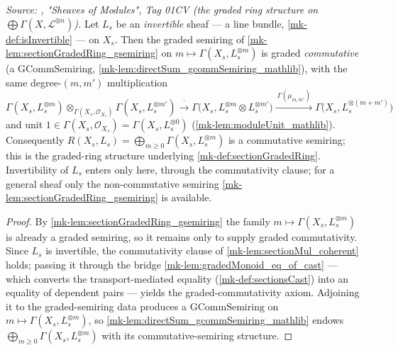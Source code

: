 \begin{lemma}\label{mk-lem:sectionGradedRing_gcommSemiring}
  \leanok

  \textit{Source: \cite{stacks-project}, "Sheaves of Modules", Tag 01CV (the graded
  ring structure on \(\bigoplus \Gamma(X,\mathcal{L}^{\otimes n})\)).}
  Let \(L_s\) be an \emph{invertible} sheaf --- a line bundle,
  \ref{mk-def:isInvertible} --- on \(X_s\). Then the graded semiring of
  \ref{mk-lem:sectionGradedRing_gsemiring} on
  \(m \mapsto \Gamma(X_s, L_s^{\otimes m})\) is graded \emph{commutative} (a
  \(\mathrm{GCommSemiring}\), \ref{mk-lem:directSum_gcommSemiring_mathlib}), with the
  same degree-\((m,m')\) multiplication
  \[
    \Gamma(X_s, L_s^{\otimes m}) \otimes_{\Gamma(X_s,\mathcal{O}_{X_s})}
      \Gamma(X_s, L_s^{\otimes m'})
    \xrightarrow{\ \cdot\ }
    \Gamma\bigl(X_s, L_s^{\otimes m} \otimes L_s^{\otimes m'}\bigr)
    \xrightarrow{\ \Gamma(\mu_{m,m'})\ }
    \Gamma\bigl(X_s, L_s^{\otimes (m+m')}\bigr)
  \]
  and unit \(1 \in \Gamma(X_s, \mathcal{O}_{X_s}) = \Gamma(X_s, L_s^{\otimes 0})\)
  (\ref{mk-lem:moduleUnit_mathlib}). Consequently
  \(R(X_s, L_s) = \bigoplus_{m \ge 0} \Gamma(X_s, L_s^{\otimes m})\) is a
  commutative semiring; this is the graded-ring structure underlying
  \ref{mk-def:sectionGradedRing}. Invertibility of \(L_s\) enters only here, through
  the commutativity clause; for a general sheaf only the non-commutative semiring
  \ref{mk-lem:sectionGradedRing_gsemiring} is available.
\end{lemma}

\begin{proof}
  \leanok
    By \ref{mk-lem:sectionGradedRing_gsemiring} the family
  \(m \mapsto \Gamma(X_s, L_s^{\otimes m})\) is already a graded semiring, so it
  remains only to supply graded commutativity. Since \(L_s\) is invertible, the
  commutativity clause of \ref{mk-lem:sectionMul_coherent} holds; passing it through
  the bridge \ref{mk-lem:gradedMonoid_eq_of_cast} --- which converts the
  transport-mediated equality (\ref{mk-def:sectionsCast}) into an equality of
  dependent pairs --- yields the graded-commutativity axiom. Adjoining it to the
  graded-semiring data produces a \(\mathrm{GCommSemiring}\) on
  \(m \mapsto \Gamma(X_s, L_s^{\otimes m})\), so
  \ref{mk-lem:directSum_gcommSemiring_mathlib} endows
  \(\bigoplus_{m \ge 0} \Gamma(X_s, L_s^{\otimes m})\) with its commutative-semiring
  structure.
\end{proof}

